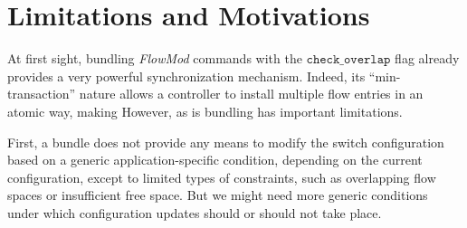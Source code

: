 \documentclass[conference]{sigcomm-alternate}
\newcommand{\checko}{\texttt{check\_overlap}\xspace}
\newcommand{\stefan}[1]{\textit{\textcolor{red}{[stefan]: #1}}} %
\newcommand{\liron}[1]{\textit{\textcolor{mygreen}{[liron]: #1}}} %
\newcommand{\petr}[1]{\textit{\textcolor{blue}{[petr]: #1}}} %
\begin{document}




\section{Limitations and Motivations}\label{sec:motivation} 


At first sight, bundling \emph{FlowMod} commands with  the $\checko$
flag already provides a very powerful synchronization mechanism.
Indeed, its ``min-transaction'' nature allows a controller 
to install multiple flow entries in an atomic way, making
However, as is 
bundling has important limitations.

First, %
a bundle does not provide any means to modify the switch configuration 
based on a generic application-specific condition, depending on the
current configuration, except to limited types of constraints, such as
overlapping flow spaces or insufficient free space.
But we might need more generic conditions under which configuration
updates 
should or should not take place.   

 
\end{document}
